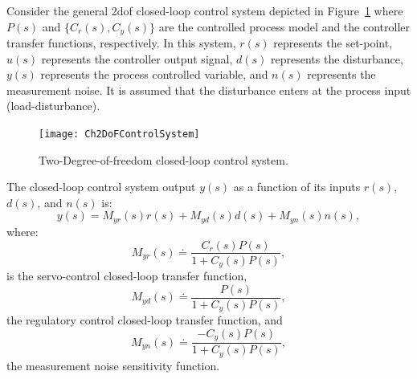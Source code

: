 Consider the general \gls{2dof} closed-loop control system depicted in Figure~\ref{Ch2fig:DoFControlSystem} where $P(s)$ and $\{C_r(s), C_y(s)\}$ are the controlled process model and the controller transfer functions, respectively.  In this system, $r(s)$ represents the set-point, $u(s)$ represents the controller output signal, $d(s)$ represents the disturbance, $y(s)$ represents the process controlled variable, and $n(s)$ represents the measurement noise. It is assumed that the disturbance enters at the process input (load-disturbance).
%
\begin{figure}[tb]
\centering
	\texttt{[image: Ch2DoFControlSystem]} 
\caption{Two-Degree-of-freedom closed-loop control system.} 
\label{Ch2fig:DoFControlSystem}
\end{figure}

The closed-loop control system output $y(s)$ as a function of its inputs $r(s)$, $d(s)$, and $n(s)$ is:
%
\begin{equation}
	y(s) = M_{yr}(s) r(s) + M_{yd}(s) d(s) + M_{yn}(s) n(s), \label{Ch2eq:yt}
\end{equation}
%
where:
\begin{equation}
	M_{yr}(s) \doteq \frac{C_r(s)P(s)}{1+C_y(s)P(s)}, \label{Ch2eq:myr}
\end{equation}
%
is the servo-control closed-loop transfer function, 
\begin{equation}
	M_{yd}(s) \doteq \frac{P(s)}{1+C_y(s)P(s)}, \label{Ch2eq:myd}
\end{equation}
%
the regulatory control closed-loop transfer function, and
\begin{equation}
	M_{yn}(s) \doteq \frac{-C_y(s)P(s)}{1+C_y(s)P(s)}, \label{Ch2eq:myn}
\end{equation}
%
the measurement noise sensitivity function.

